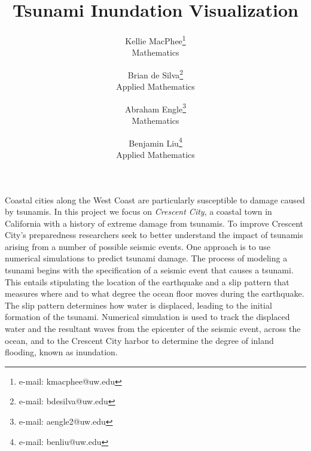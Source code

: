 \documentclass{vgtc}                          %
\title{Tsunami Inundation Visualization}
\author{Kellie MacPhee\thanks{e-mail: kmacphee@uw.edu}\\ %
    \scriptsize Mathematics %
\and Brian de Silva\thanks{e-mail: bdesilva@uw.edu}\\ %
    \scriptsize Applied Mathematics %
\and Abraham Engle\thanks{e-mail: aengle2@uw.edu}\\ %
    \scriptsize Mathematics %
\and Benjamin Liu\thanks{e-mail: benliu@uw.edu}\\ %
    \scriptsize Applied Mathematics
}
\begin{document}

\maketitle


Coastal cities along the West Coast are particularly susceptible to damage caused by tsunamis.
In this project we focus on \emph{Crescent City}, a coastal town in California with a history of extreme damage from tsunamis. To improve Crescent City’s preparedness researchers seek to better understand the impact of tsunamis arising from a number of possible seismic events. One approach is to use numerical simulations to predict tsunami damage. The process of modeling a tsunami begins with the specification of a seismic event that causes a tsunami. This entails stipulating the location of the earthquake and a slip pattern that measures where and to what degree the ocean floor moves during the earthquake. The slip pattern determines how water is displaced, leading to the initial formation of the tsunami. Numerical simulation is used to track the displaced water and the resultant waves from the epicenter of the seismic event, across the ocean, and to the Crescent City harbor to determine the degree of inland flooding, known as inundation.
\end{document}
